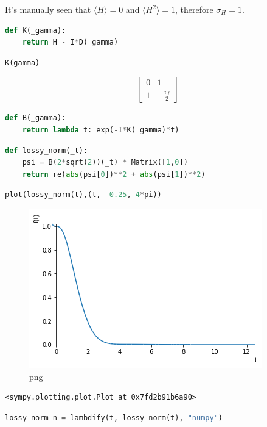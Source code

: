 It's manually seen that \(\langle H \rangle = 0\) and
\(\langle H^2 \rangle = 1\), therefore \(\sigma_{H} = 1\).

\begin{lstlisting}[language=Python]
def K(_gamma):
    return H - I*D(_gamma)
\end{lstlisting}

\begin{lstlisting}[language=Python]
K(gamma)
\end{lstlisting}

\[\left[\begin{matrix}0 & 1\\1 & - \frac{i \gamma}{2}\end{matrix}\right]\]

\begin{lstlisting}[language=Python]
def B(_gamma):
    return lambda t: exp(-I*K(_gamma)*t)
\end{lstlisting}

\begin{lstlisting}[language=Python]
def lossy_norm(_t):
    psi = B(2*sqrt(2))(_t) * Matrix([1,0])
    return re(abs(psi[0])**2 + abs(psi[1])**2)
\end{lstlisting}

\begin{lstlisting}[language=Python]
plot(lossy_norm(t),(t, -0.25, 4*pi))
\end{lstlisting}

\begin{figure}
\centering
\includegraphics{img/2ldetect/denorm.png}
\caption{png}
\end{figure}

\begin{lstlisting}
<sympy.plotting.plot.Plot at 0x7fd2b91b6a90>
\end{lstlisting}

\begin{lstlisting}[language=Python]
lossy_norm_n = lambdify(t, lossy_norm(t), "numpy")
\end{lstlisting}

